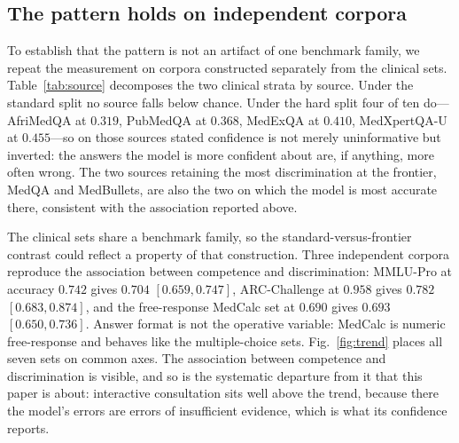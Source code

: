 \documentclass[journal,twoside]{IEEEtran}
\begin{document}
\subsection{The pattern holds on independent corpora}
To establish that the pattern is not an artifact of one benchmark family, we repeat the measurement
on corpora constructed separately from the clinical sets.
Table~\ref{tab:source} decomposes the two clinical strata by source. Under the standard
split no source falls below chance. Under the hard split four of ten do---AfriMedQA at $0.319$,
PubMedQA at $0.368$, MedExQA at $0.410$, MedXpertQA-U at $0.455$---so on those sources stated
confidence is not merely uninformative but inverted: the answers the model is more confident about
are, if anything, more often wrong. The two sources retaining the most discrimination at the
frontier, MedQA and MedBullets, are also the two on which the model is most accurate there,
consistent with the association reported above.

The clinical sets share a benchmark family, so the standard-versus-frontier contrast could reflect a
property of that construction. Three independent corpora reproduce the association between
competence and discrimination: MMLU-Pro at accuracy $0.742$ gives $0.704$ $[0.659,0.747]$,
ARC-Challenge at $0.958$ gives $0.782$ $[0.683,0.874]$, and the free-response MedCalc set at $0.690$
gives $0.693$ $[0.650,0.736]$. Answer format is not the operative variable: MedCalc is numeric
free-response and behaves like the multiple-choice sets. Fig.~\ref{fig:trend} places all seven sets on
common axes. The association between competence and discrimination is visible, and so is the
systematic departure from it that this paper is about: interactive consultation sits well above the
trend, because there the model's errors are errors of insufficient evidence, which is what its
confidence reports.

\begin{table}[!htb]
\caption{First stage: realised reasoning tokens by assigned operating point,
\texttt{gpt-5.4-mini}. The assignment moves the resource by more than an order of magnitude with no
truncation, which is what licenses treating the nominal effort setting as a resource manipulation
rather than a label.}
\label{tab:firststage}
\centering
\small
{}
\end{table}
\end{document}
